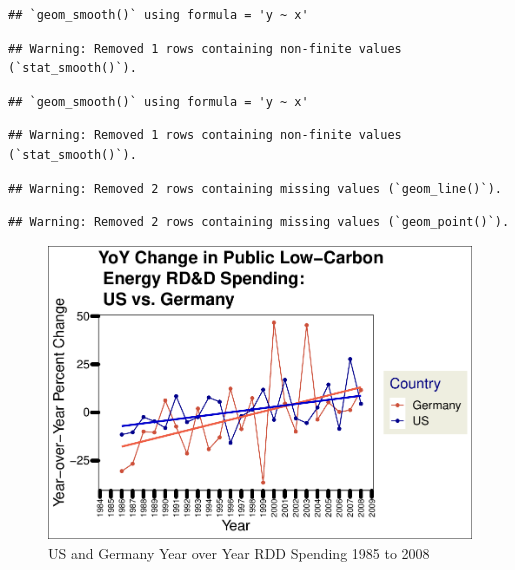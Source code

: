 \documentclass[
  12pt,
]{article}
\begin{document}
\begin{verbatim}
## `geom_smooth()` using formula = 'y ~ x'
\end{verbatim}

\begin{verbatim}
## Warning: Removed 1 rows containing non-finite values (`stat_smooth()`).
\end{verbatim}

\begin{verbatim}
## `geom_smooth()` using formula = 'y ~ x'
\end{verbatim}

\begin{verbatim}
## Warning: Removed 1 rows containing non-finite values (`stat_smooth()`).
\end{verbatim}

\begin{verbatim}
## Warning: Removed 2 rows containing missing values (`geom_line()`).
\end{verbatim}

\begin{verbatim}
## Warning: Removed 2 rows containing missing values (`geom_point()`).
\end{verbatim}

\begin{figure}
\centering
\includegraphics{Chang_Jenkins_Mullens_ENV872_Final_files/figure-latex/visualizing the pre US and Germany data together-1.pdf}
\caption{US and Germany Year over Year RDD Spending 1985 to 2008}
\end{figure}
\end{document}
